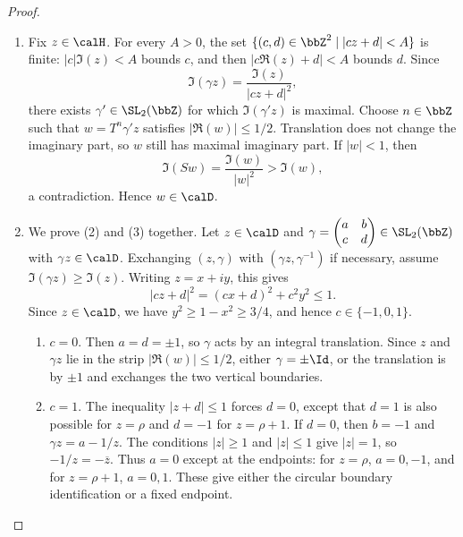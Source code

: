 \begin{proof}
    \leavevmode
    \begin{enumerate}
        \item Fix $z \in \calH$. For every $A > 0$, the set $\{(c, d) \in \bbZ^2 \mid |cz + d| < A\}$ is finite: $|c|\Im(z) < A$ bounds $c$, and then $|c\Re(z) + d| < A$ bounds $d$. Since
        \[
            \Im(\gamma z) = \frac{\Im(z)}{|cz + d|^2},
        \]
        there exists $\gamma' \in \SL_2(\bbZ)$ for which $\Im(\gamma'z)$ is maximal. Choose $n \in \bbZ$ such that $w = T^n\gamma'z$ satisfies $|\Re(w)| \le 1/2$. Translation does not change the imaginary part, so $w$ still has maximal imaginary part. If $|w| < 1$, then
        \[
            \Im(Sw) = \frac{\Im(w)}{|w|^2} > \Im(w),
        \]
        a contradiction. Hence $w \in \calD$.
        \item We prove (2) and (3) together. Let $z \in \calD$ and $\gamma = \begin{pmatrix}a & b\\ c & d\end{pmatrix} \in \SL_2(\bbZ)$ with $\gamma z \in \calD$. Exchanging $(z, \gamma)$ with $(\gamma z, \gamma^{-1})$ if necessary, assume $\Im(\gamma z) \ge \Im(z)$. Writing $z = x + iy$, this gives
        \[
            |cz + d|^2 = (cx + d)^2 + c^2y^2 \le 1.
        \]
        Since $z \in \calD$, we have $y^2 \ge 1 - x^2 \ge 3/4$, and hence $c \in \{-1, 0, 1\}$.
        \begin{enumerate}[label=\textit{Case~\arabic*.}]
            \item $c = 0$.
            Then $a = d = \pm 1$, so $\gamma$ acts by an integral translation. Since $z$ and $\gamma z$ lie in the strip $|\Re(w)| \le 1/2$, either $\gamma = \pm\Id$, or the translation is by $\pm 1$ and exchanges the two vertical boundaries.
            \item $c = 1$.
            The inequality $|z + d| \le 1$ forces $d = 0$, except that $d = 1$ is also possible for $z = \rho$ and $d = -1$ for $z = \rho + 1$.
            If $d = 0$, then $b = -1$ and $\gamma z = a - 1/z$. The conditions $|z| \ge 1$ and $|z| \le 1$ give $|z| = 1$, so $-1/z = -\overline z$. Thus $a = 0$ except at the endpoints: for $z = \rho$, $a = 0, -1$, and for $z = \rho + 1$, $a = 0, 1$. These give either the circular boundary identification or a fixed endpoint.


\end{enumerate}
\end{enumerate}
\end{proof}
